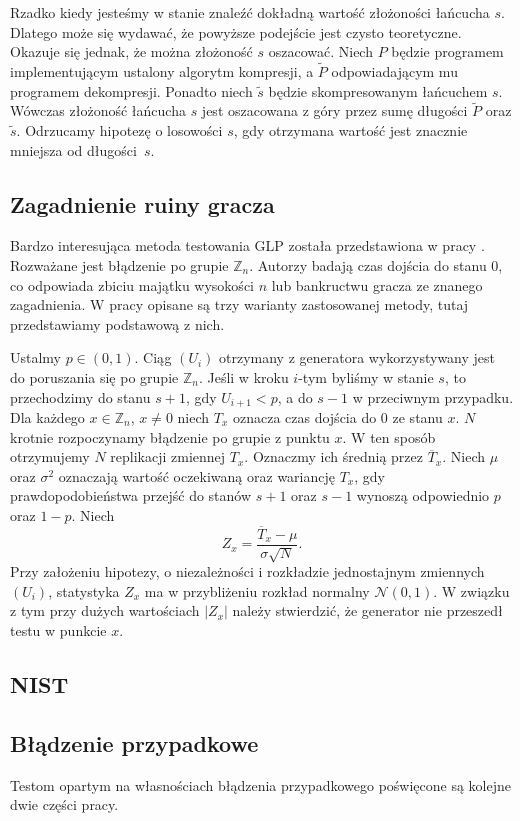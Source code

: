 \documentclass[a4paper,11pt,twoside]{book}
\theoremstyle{definition}
\begin{document}
Rzadko kiedy jesteśmy w stanie znaleźć dokładną wartość złożoności łańcucha $s$. Dlatego może się wydawać, że powyższe podejście jest czysto teoretyczne. Okazuje się jednak, że można złożoność $s$ oszacować. Niech $P$ będzie programem implementującym ustalony algorytm kompresji, a $\tilde{P}$ odpowiadającym mu programem dekompresji. Ponadto niech $\tilde{s}$ będzie skompresowanym łańcuchem $s$. Wówczas złożoność łańcucha $s$ jest oszacowana z góry przez sumę długości $\tilde{P}$ oraz $\tilde{s}$. Odrzucamy hipotezę o losowości $s$, gdy otrzymana wartość jest znacznie mniejsza od długości~$s$.

\subsection*{Zagadnienie ruiny gracza}
Bardzo interesująca metoda testowania GLP została przedstawiona w pracy \cite{kim-choe}. Rozważane jest błądzenie po grupie $\mathbb{Z}_n$. Autorzy badają czas dojścia do stanu $0$, co odpowiada zbiciu majątku wysokości $n$ lub bankructwu gracza ze znanego zagadnienia. W pracy opisane są trzy warianty zastosowanej metody, tutaj przedstawiamy podstawową z nich.

Ustalmy $p \in (0,1)$. Ciąg $(U_i)$ otrzymany z generatora wykorzystywany jest do poruszania się po grupie $\mathbb{Z}_n$. Jeśli w kroku $i$-tym byliśmy w stanie $s$, to przechodzimy do stanu $s+1$, gdy $U_{i+1} < p$, a do $s-1$ w przeciwnym przypadku. Dla każdego $x \in \mathbb{Z}_n$, $x \neq 0$ niech $T_x$ oznacza czas dojścia do $0$ ze stanu $x$. $N$ krotnie rozpoczynamy błądzenie po grupie z punktu $x$. W ten sposób otrzymujemy $N$ replikacji zmiennej $T_x$. Oznaczmy ich średnią przez $\overline{T}_x$. Niech $\mu$ oraz $\sigma^2$ oznaczają wartość oczekiwaną oraz wariancję $T_x$, gdy prawdopodobieństwa przejść do stanów $s+1$ oraz $s-1$ wynoszą odpowiednio $p$ oraz $1-p$. Niech
\[ Z_x = \frac{\overline{T}_x - \mu}{\sigma \sqrt{N}}. \]
Przy założeniu hipotezy, o niezależności i rozkładzie jednostajnym zmiennych $(U_i)$, statystyka $Z_x$ ma w przybliżeniu rozkład normalny $\mathcal{N}(0,1)$. W związku z tym przy dużych wartościach $|Z_x|$ należy stwierdzić, że generator nie przeszedł testu w punkcie $x$. 


\subsection*{NIST}


\subsection*{Błądzenie przypadkowe}
Testom opartym na własnościach błądzenia przypadkowego poświęcone są kolejne dwie części pracy.
\end{document}
